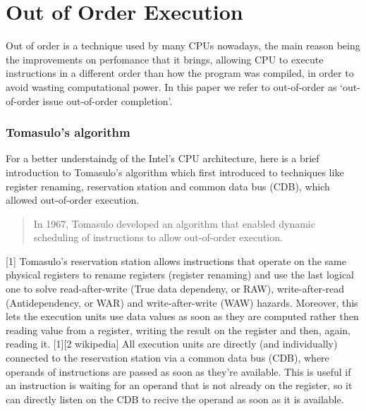 \section{Out of Order Execution}
Out of order is a technique used by many CPUs nowadays, the main reason being the improvements on perfomance that it brings, allowing
CPU to execute instructions in a different order than how the program was compiled, in order to avoid wasting computational power.
In this paper we refer to out-of-order as `out-of-order issue out-of-order completion'.

\subsubsection{Tomasulo's algorithm}
For a better understaindg of the Intel's CPU architecture, here is a brief introduction to Tomasulo's algorithm which
first introduced to techniques like register renaming, reservation station and common data bus (CDB), which allowed
out-of-order execution.

\begin{quote}
    In 1967, Tomasulo developed an algorithm that
    enabled dynamic scheduling of instructions to allow
    out-of-order execution.
\end{quote} [1]
Tomasulo's reservation station allows instructions that operate on the same physical registers to rename registers (register renaming)
and use the last logical one to solve read-after-write (True data dependeny, or RAW), write-after-read (Antidependency, or WAR) and
write-after-write (WAW) hazards. Moreover, this lets the execution units use data values as soon as they are computed rather then reading value from a register,
writing the result on the register and then, again, reading it. [1][2 wikipedia]
All execution units are directly (and individually) connected to the reservation station via a common data bus (CDB), where operands of instructions are
passed as soon as they're available. This is useful if an instruction is waiting for an operand that is not already on the register, so it can directly listen
on the CDB to recive the operand as soon as it is available.

